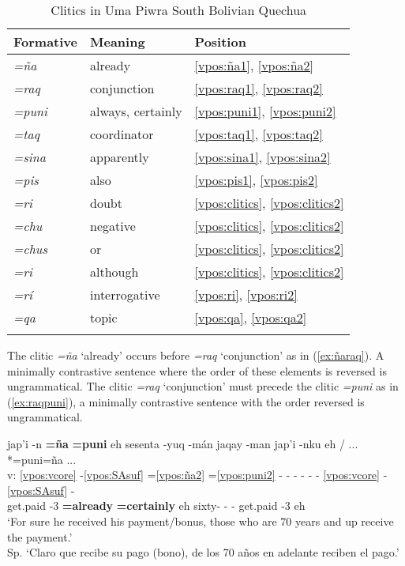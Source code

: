 \documentclass[output=paper]{langscibook}
\begin{document}
\begin{table}[htp]
\caption{Clitics in Uma Piwra South Bolivian Quechua}
\label{tab:clitics}
\begin{tabular}{lll}
\lsptoprule
Formative & Meaning           & Position \\ \midrule
\textit{=ña }      & already           & \ref{vpos:ña1}, \ref{vpos:ña2}   \\
\textit{=raq}     & conjunction       & \ref{vpos:raq1}, \ref{vpos:raq2}   \\
\textit{=puni}     & always, certainly & \ref{vpos:puni1}, \ref{vpos:puni2}   \\
\textit{=taq}     & coordinator & \ref{vpos:taq1}, \ref{vpos:taq2}   \\
\textit{=sina}     & apparently        & \ref{vpos:sina1}, \ref{vpos:sina2}   \\
\textit{=pis}      & also              & \ref{vpos:pis1}, \ref{vpos:pis2}   \\
\textit{=ri}       & doubt             & \ref{vpos:clitics}, \ref{vpos:clitics2}    \\
\textit{=chu}      & negative          & \ref{vpos:clitics}, \ref{vpos:clitics2}    \\
\textit{=chus}     & or                & \ref{vpos:clitics}, \ref{vpos:clitics2}    \\
\textit{=ri}       & although          & \ref{vpos:clitics}, \ref{vpos:clitics2}    \\
\textit{=rí}       & interrogative     & \ref{vpos:ri}, \ref{vpos:ri2}   \\
\textit{=qa}       & topic             & \ref{vpos:qa}, \ref{vpos:qa2}   \\
\lspbottomrule    
\end{tabular}
\end{table}

The clitic \textit{=ña} `already' occurs before \textit{=raq} `conjunction' as in (\ref{ex:ñaraq}). A minimally contrastive sentence where the order of these elements is reversed is ungrammatical. The clitic \textit{=raq} `conjunction' must precede the clitic \textit{=puni} as in (\ref{ex:raqpuni}), a minimally contrastive sentence with the order reversed is ungrammatical. 

\ea \label{ex:ñaraq}{
    \glll {} jap'i -n \textbf{=ña} \textbf{=puni} eh sesenta -yuq -mán jaqay -man jap'i -nku eh / ... *=puni=ña ...  \\
    v: \ref{vpos:vcore} -\ref{vpos:SAsuf} =\ref{vpos:ña2} =\ref{vpos:puni2} - - - - - - \ref{vpos:vcore} -\ref{vpos:SAsuf} - \\
    {} get.paid -3\Sg{} \textbf{=already} \textbf{=certainly} eh sixty-\Gen{} -\Abl{} \Dem{} -\All{} get.paid -3\Pl{} eh   \\
    \glt `For sure he received his payment/bonus, those who are 70 years and up receive the payment.' \\ Sp. `Claro que recibe su pago (bono), de los 70 años en adelante reciben el pago.' }
\z
\end{document}
